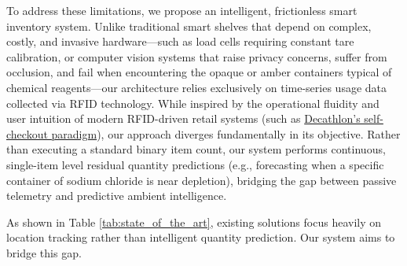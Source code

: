 \documentclass[10pt,twocolumn,letterpaper]{article}
\begin{document}
To address these limitations, we propose an intelligent, frictionless smart inventory system. Unlike traditional smart shelves that depend on complex, costly, and invasive hardware—such as load cells requiring constant tare calibration, or computer vision systems that raise privacy concerns, suffer from occlusion, and fail when encountering the opaque or amber containers typical of chemical reagents—our architecture relies exclusively on time-series usage data collected via RFID technology. While inspired by the operational fluidity and user intuition of modern RFID-driven retail systems (such as \href{https://www.decathlonrfidservices.com/decathlon-rain-rfid-project}{Decathlon's self-checkout paradigm}), our approach diverges fundamentally in its objective. Rather than executing a standard binary item count, our system performs continuous, single-item level residual quantity predictions (e.g., forecasting when a specific container of sodium chloride is near depletion), bridging the gap between passive telemetry and predictive ambient intelligence. 

\begin{table}[htbp]
\centering
\caption{State-of-the-art comparison between existing solutions and our proposed prototype.}
\label{tab:state_of_the_art}
\end{table}

As shown in Table \ref{tab:state_of_the_art}, existing solutions focus heavily on location tracking rather than intelligent quantity prediction. Our system aims to bridge this gap.
\end{document}
